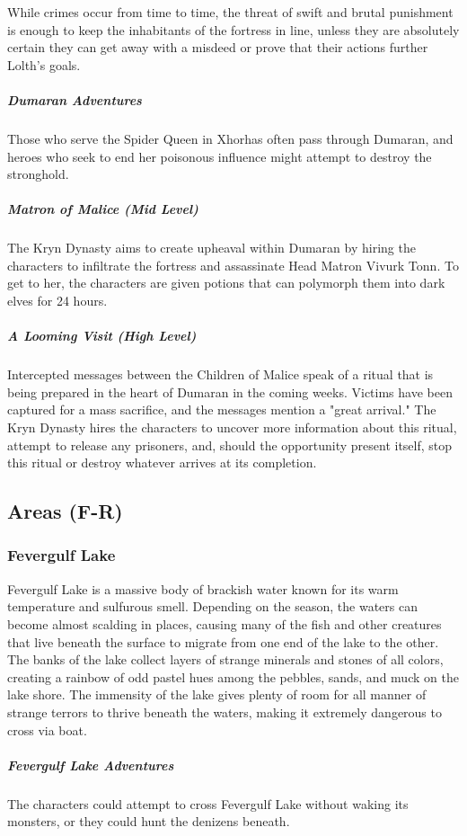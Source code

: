 \documentclass[10pt,a4paper,twoside,bg=print,twocolumn,openany,nodeprecatedcode]{dndbook}
\begin{document}
While crimes occur from time to time, the threat of swift and brutal punishment is enough to keep the inhabitants of the fortress in line, unless they are absolutely certain they can get away with a misdeed or prove that their actions further Lolth's goals.

\subparagraph{Dumaran Adventures}
Those who serve the Spider Queen in Xhorhas often pass through Dumaran, and heroes who seek to end her poisonous influence might attempt to destroy the stronghold.

\subparagraph{Matron of Malice (Mid Level)}
The Kryn Dynasty aims to create upheaval within Dumaran by hiring the characters to infiltrate the fortress and assassinate Head Matron Vivurk Tonn. To get to her, the characters are given potions that can polymorph them into dark elves for 24 hours.

\subparagraph{A Looming Visit (High Level)}
Intercepted messages between the Children of Malice speak of a ritual that is being prepared in the heart of Dumaran in the coming weeks. Victims have been captured for a mass sacrifice, and the messages mention a "great arrival." The Kryn Dynasty hires the characters to uncover more information about this ritual, attempt to release any prisoners, and, should the opportunity present itself, stop this ritual or destroy whatever arrives at its completion.

\subsection{Areas (F-R)}
\subsubsection{Fevergulf Lake}
Fevergulf Lake is a massive body of brackish water known for its warm temperature and sulfurous smell. Depending on the season, the waters can become almost scalding in places, causing many of the fish and other creatures that live beneath the surface to migrate from one end of the lake to the other. The banks of the lake collect layers of strange minerals and stones of all colors, creating a rainbow of odd pastel hues among the pebbles, sands, and muck on the lake shore. The immensity of the lake gives plenty of room for all manner of strange terrors to thrive beneath the waters, making it extremely dangerous to cross via boat.

\subparagraph{Fevergulf Lake Adventures}
The characters could attempt to cross Fevergulf Lake without waking its monsters, or they could hunt the denizens beneath.
\end{document}
